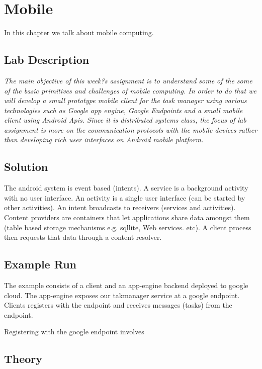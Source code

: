 \chapter{Mobile}
\minitoc

In this chapter we talk about mobile computing. 

\section{Lab Description}

\textit{The main objective of this week?s assignment is to understand some of the some of the basic primitives and challenges of mobile computing. In order to do that we will develop a small prototype mobile client for the task manager using various technologies such as Google app engine, Google Endpoints and a small mobile client using  Android Apis. Since it is distributed systems class, the focus of lab assignment is more on the communication protocols with the mobile devices rather than developing rich user interfaces on Android mobile platform.}

\section{Solution}

The android system is event based (intents). A service is a background activity with no user interface. An activity is a single user interface (can be started by other activities). An intent broadcasts to receivers (services and activities). Content providers are containers that let applications share data amongst them (table based storage mechanisms e.g. sqllite, Web services. etc). A client process then requests that data through a content resolver. 


\section{Example Run}
The example consists of a client and an app-engine backend deployed to google cloud. The app-engine exposes our takmanager service at a google endpoint. Clients registers with the endpoint and receives messages (tasks) from the endpoint. 

Registering with the google endpoint involves  



\section{Theory}

